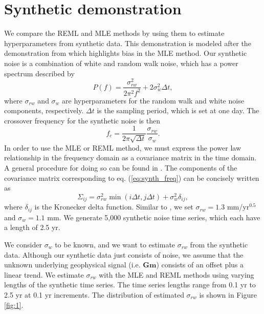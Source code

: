 \section{Synthetic demonstration}\label{sec:3}
We compare the REML and MLE methods by using them to estimate hyperparameters from synthetic data. This demonstration is modeled after the demonstration from \citet{Langbein2012} which highlights bias in the MLE method. Our synthetic noise is a combination of white and random walk noise, which has a power spectrum described by
\begin{equation}\label{eq:synth_freq}
P(f) = \frac{\sigma_{rw}^2}{2\pi^2 f^2} + 2\sigma_w^2\Delta t,
\end{equation}  
where $\sigma_{rw}$ and $\sigma_w$ are hyperparameters for the random walk and white noise components, respectively. $\Delta t$ is the sampling period, which is set at one day. The crossover frequency for the synthetic noise is then
\begin{equation}
f_c = \frac{1}{2\pi\sqrt{\Delta t}}\frac{\sigma_{rw}}{\sigma_w}.  
\end{equation}
In order to use the MLE or REML method, we must express the power law relationship in the frequency domain as a covariance matrix in the time domain. A general procedure for doing  so can be found in \citet{Langbein2004}. The components of the covariance matrix corresponding to eq. (\ref{eq:synth_freq}) can be concisely written as
\begin{equation}
\Sigma_{ij} = \sigma_{rw}^2 \min(i\Delta t,j\Delta t) + \sigma_w^2 \delta_{ij},
\end{equation} 
where $\delta_{ij}$ is the Kronecker delta function. Similar to \citet{Langbein2012}, we set $\sigma_{rw} = 1.3$ mm/yr$^{0.5}$ and $\sigma_w = 1.1$ mm. We generate 5,000 synthetic noise time series, which each have a length of 2.5 yr. 

We consider $\sigma_w$ to be known, and we want to estimate $\sigma_{rw}$ from the synthetic data. Although our synthetic data just consists of noise, we assume that the unknown underlying geophysical signal (i.e. $\mathbf{G}\mathbf{m}$) consists of an offset plus a linear trend. We estimate $\sigma_{rw}$ with the MLE and REML methods using varying lengths of the synthetic time series. The time series lengths range from 0.1 yr to 2.5 yr at 0.1 yr increments. The distribution of estimated $\sigma_{rw}$ is shown in Figure \ref{fig:1}. 

